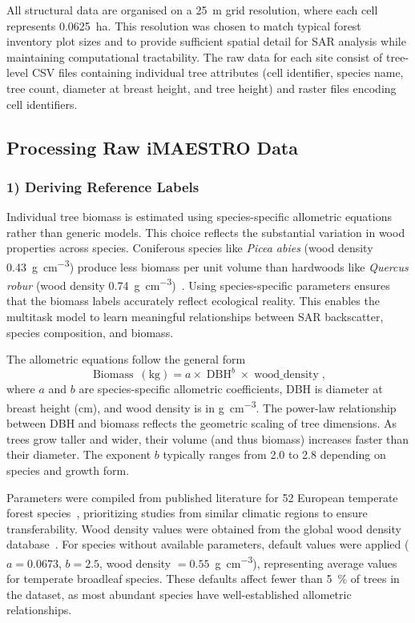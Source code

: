 All structural data are organised on a \SI{25}{\meter} grid resolution, where each cell represents \SI{0.0625}{\hectare}. This resolution was chosen to match typical forest inventory plot sizes and to provide sufficient spatial detail for SAR analysis while maintaining computational tractability. The raw data for each site consist of tree-level CSV files containing individual tree attributes (cell identifier, species name, tree count, diameter at breast height, and tree height) and raster files encoding cell identifiers.

\subsection{Processing Raw iMAESTRO Data}

\subsubsection{1) Deriving Reference Labels}

Individual tree biomass is estimated using species-specific allometric equations rather than generic models. This choice reflects the substantial variation in wood properties across species. Coniferous species like \textit{Picea abies} (wood density \SI{0.43}{\gram\per\centi\meter\cubed}) produce less biomass per unit volume than hardwoods like \textit{Quercus robur} (wood density \SI{0.74}{\gram\per\centi\meter\cubed})~\cite{zanne_data_2009}. Using species-specific parameters ensures that the biomass labels accurately reflect ecological reality. This enables the multitask model to learn meaningful relationships between SAR backscatter, species composition, and biomass.

The allometric equations follow the general form
\begin{equation}
    \operatorname{Biomass}~(\si{\kilogram}) = a \times \operatorname{DBH}^b \times \operatorname{wood\_density},
\end{equation}
where $a$ and $b$ are species-specific allometric coefficients, DBH is diameter at breast height (\si{\centi\meter}), and wood density is in \si{\gram\per\centi\meter\cubed}. The power-law relationship between DBH and biomass reflects the geometric scaling of tree dimensions. As trees grow taller and wider, their volume (and thus biomass) increases faster than their diameter. The exponent $b$ typically ranges from 2.0 to 2.8 depending on species and growth form.

Parameters were compiled from published literature for 52 European temperate forest species~\cite{forrester_generalized_2017}, prioritizing studies from similar climatic regions to ensure transferability. Wood density values were obtained from the global wood density database~\cite{zanne_data_2009,chave_towards_2009}. For species without available parameters, default values were applied ($a = 0.0673$, $b = 2.5$, wood density $= 0.55$~\si{\gram\per\centi\meter\cubed}), representing average values for temperate broadleaf species. These defaults affect fewer than \SI{5}{\percent} of trees in the dataset, as most abundant species have well-established allometric relationships.

